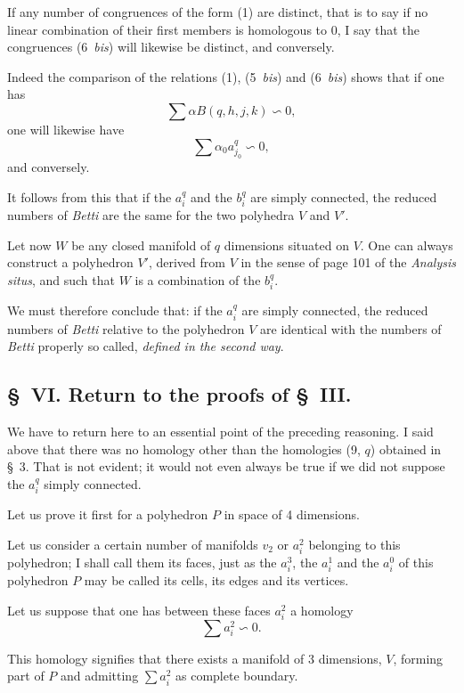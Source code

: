 \documentclass{article}
\begin{document}
If any number of congruences of the form (1) are distinct, that is to say if no linear combination of their first
members is homologous to 0, I say that the congruences (6~\emph{bis}) will likewise be distinct, and conversely.

Indeed the comparison of the relations (1), (5~\emph{bis}) and (6~\emph{bis}) shows that if one has
\[ \sum \alpha B(q, h, j, k) \backsim 0, \]
one will likewise have
\[ \sum \alpha_{0} a^{q}_{j_{0}} \backsim 0, \]
and conversely.

It follows from this that if the $a^{q}_{i}$ and the $b^{q}_{i}$ are simply connected, the reduced numbers of \emph{Betti} are the same for the two polyhedra $V$ and $V'$.

Let now $W$ be any closed manifold of $q$ dimensions situated on $V$. One can always construct a polyhedron $V'$, derived from $V$ in the sense of page 101 of the \emph{Analysis situs}, and such that $W$ is a combination of the $b^{q}_{i}$.

We must therefore conclude that: if the $a^{q}_{i}$ are simply connected, the reduced numbers of \emph{Betti} relative to the polyhedron $V$ are identical with the numbers of \emph{Betti} properly so called, \emph{defined in the second way}.

\subsection*{\S~VI. Return to the proofs of \S~III.}

We have to return here to an essential point of the preceding reasoning. I said above that there was no homology other than the homologies (9, $q$) obtained in \S~3. That is not evident; it would not even always be true if we did not suppose the $a^{q}_{i}$ simply connected.

Let us prove it first for a polyhedron $P$ in space of 4 dimensions.

Let us consider a certain number of manifolds $v_{2}$ or $a^{2}_{i}$ belonging to this polyhedron; I shall call them its faces, just as the $a^{3}_{i}$, the $a^{1}_{i}$ and the $a^{0}_{i}$ of this polyhedron $P$ may be called its cells, its edges and its vertices.


Let us suppose that one has between these faces $a^{2}_{i}$ a homology
\[ \sum a^{2}_{i} \backsim 0. \]

This homology signifies that there exists a manifold of 3 dimensions, $V$, forming part of $P$ and admitting $\displaystyle\sum a^{2}_{i}$ as complete boundary.
\end{document}
